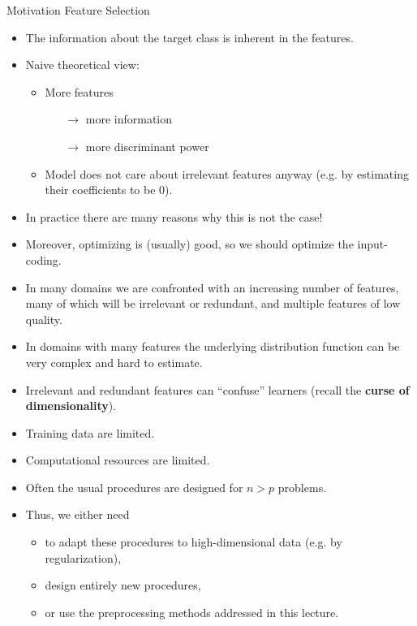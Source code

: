 \begin{vbframe}{Motivation Feature Selection}
\begin{itemize}
\item The information about the target class is inherent in the features.
\item Naive theoretical view:
  \begin{itemize}
  \item More features
    \begin{itemize}
    \item[$\rightarrow$] more information
    \item[$\rightarrow$] more discriminant power
    \end{itemize}
  \item Model does not care about irrelevant features anyway (e.g. by estimating their coefficients to be 0).
  \end{itemize}
\item In practice there are many reasons why this is not the case!
\item Moreover, optimizing is (usually) good, so we should optimize the input-coding.
\end{itemize}

\framebreak

\begin{itemize}
  \item In many domains we are confronted with an increasing number of features, many of which will be irrelevant or redundant, and multiple features of low quality.
  \item In domains with many features the underlying distribution function can be very complex and hard to estimate.
  \item Irrelevant and redundant features can \enquote{confuse} learners (recall the \textbf{curse of dimensionality}).
  \item Training data are limited.
  \item Computational resources are limited.
  \item Often the usual procedures are designed for $n > p$ problems.
  \item Thus, we either need
  \begin{itemize}
    \item to adapt these procedures to high-dimensional data (e.g. by regularization),
    \item design entirely new procedures,
    \item or use the preprocessing methods addressed in this lecture.
  \end{itemize}
\end{itemize}
\end{vbframe}

